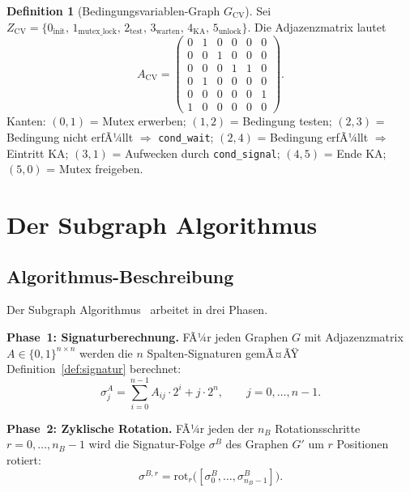 ﻿\documentclass[a4paper,12pt]{article}
\theoremstyle{definition}
\newtheorem{definition}{Definition}
\begin{document}
\begin{definition}[Bedingungsvariablen-Graph $G_{\mathrm{CV}}$]
  \label{def:cv}
  Sei $Z_{\mathrm{CV}} = \{0_{\mathrm{init}},\, 1_{\mathrm{mutex\_lock}},\,
  2_{\mathrm{test}},\, 3_{\mathrm{warten}},\, 4_{\mathrm{KA}},\, 5_{\mathrm{unlock}}\}$.
  Die Adjazenzmatrix lautet
  \[
    A_{\mathrm{CV}} =
    \begin{pmatrix}
      0 & 1 & 0 & 0 & 0 & 0 \\
      0 & 0 & 1 & 0 & 0 & 0 \\
      0 & 0 & 0 & 1 & 1 & 0 \\
      0 & 1 & 0 & 0 & 0 & 0 \\
      0 & 0 & 0 & 0 & 0 & 1 \\
      1 & 0 & 0 & 0 & 0 & 0
    \end{pmatrix}.
  \]
  Kanten: $(0,1)$ = Mutex erwerben; $(1,2)$ = Bedingung testen;
  $(2,3)$ = Bedingung nicht erfÃ¼llt $\Rightarrow$ \texttt{cond\_wait};
  $(2,4)$ = Bedingung erfÃ¼llt $\Rightarrow$ Eintritt KA;
  $(3,1)$ = Aufwecken durch \texttt{cond\_signal};
  $(4,5)$ = Ende KA; $(5,0)$ = Mutex freigeben.
\end{definition}

\section{Der Subgraph Algorithmus}
\label{sec:algorithmus}

\subsection{Algorithmus-Beschreibung}

Der Subgraph Algorithmus~\cite{epp2026subgraph} arbeitet in drei Phasen.

\textbf{Phase~1: Signaturberechnung.}
FÃ¼r jeden Graphen $G$ mit Adjazenzmatrix $A \in \{0,1\}^{n \times n}$
werden die $n$ Spalten-Signaturen gemÃ¤ÃŸ Definition~\ref{def:signatur}
berechnet:
\[
  \sigma_j^A = \sum_{i=0}^{n-1} A_{ij} \cdot 2^i + j \cdot 2^n,
  \qquad j = 0, \ldots, n-1.
\]

\textbf{Phase~2: Zyklische Rotation.}
FÃ¼r jeden der $n_B$ Rotationsschritte $r = 0, \ldots, n_B - 1$ wird die
Signatur-Folge $\sigma^B$ des Graphen $G'$ um $r$ Positionen rotiert:
\[
  \sigma^{B,r} = \mathrm{rot}_r\bigl([\sigma^B_0, \ldots, \sigma^B_{n_B-1}]\bigr).
\]
\end{document}
